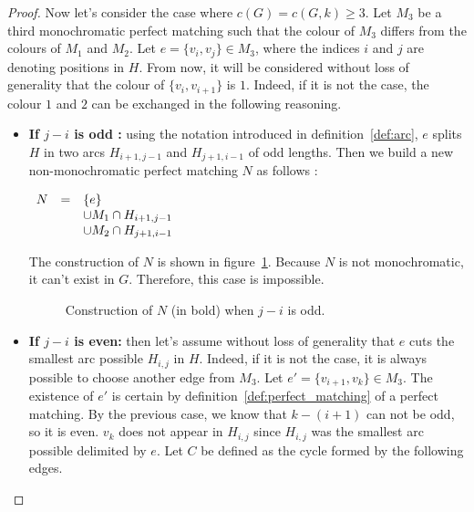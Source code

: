 \begin{proof}
    Now let's consider the case where $c(G) = c(G, k) \geq 3$.
    Let $M_3$ be a third monochromatic perfect matching such that the colour of $M_3$ differs from the colours of $M_1$ and $M_2$.
    Let $e = \{v_i, v_j\} \in M_3$, where the indices $i$ and $j$ are denoting positions in $H$.
    From now, it will be considered without loss of generality that the colour of $\{v_i, v_{i+1}\}$ is $1$.
    Indeed, if it is not the case, the colour $1$ and $2$ can be exchanged in the following reasoning.

    \begin{itemize}
        \item
            \textbf{If $j - i$ is odd :} using the notation introduced in definition~\ref{def:arc}, $e$ splits $H$ in two arcs $H_{i+1, j-1}$ and $H_{j+1, i-1}$ of odd lengths.
            Then we build a new non-monochromatic perfect matching $N$ as follows :
            
            \begin{center}
                $\begin{array}{r c l}
                    N & = & \{e\} \\
                      &   & \cup M_1 \cap H_{i+1, j-1} \\
                      &   & \cup M_2 \cap H_{j+1, i-1}
                \end{array}$        %
            \end{center}
            
            The construction of $N$ is shown in figure~\ref{fig:proof_simplified_odd}.
            Because $N$ is not monochromatic, it can't exist in $G$.
            Therefore, this case is impossible.
            
            \begin{figure}[H]
                \caption{Construction of $N$ (in bold) when $j - i$ is odd.}
                \label{fig:proof_simplified_odd}
            \end{figure}
            
        \item 
            \textbf{If $j - i$ is even:} then let's assume without loss of generality that $e$ cuts the smallest arc possible $H_{i, j}$ in $H$.
            Indeed, if it is not the case, it is always possible to choose another edge from $M_3$.
            Let $e' = \{v_{i + 1}, v_k\} \in M_3$.
            The existence of $e'$ is certain by definition~\ref{def:perfect_matching} of a perfect matching.
            By the previous case, we know that $k - (i + 1)$ can not be odd, so it is even.
            $v_k$ does not appear in $H_{i, j}$ since $H_{i, j}$ was the smallest arc possible delimited by $e$.
            Let $C$ be defined as the cycle formed by the following edges.
            

\end{itemize}
\end{proof}
